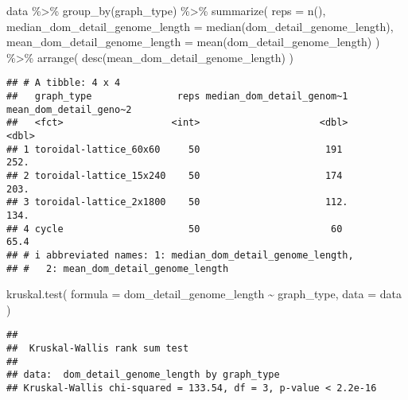 \documentclass[
]{book}
\newenvironment{Shaded}{\begin{snugshade}}{\end{snugshade}}
\newcommand{\AttributeTok}[1]{\textcolor[rgb]{0.77,0.63,0.00}{#1}}
\newcommand{\FunctionTok}[1]{\textcolor[rgb]{0.00,0.00,0.00}{#1}}
\newcommand{\NormalTok}[1]{#1}
\newcommand{\SpecialCharTok}[1]{\textcolor[rgb]{0.00,0.00,0.00}{#1}}
\begin{document}
\begin{Shaded}
\begin{Highlighting}[]
\NormalTok{data }\SpecialCharTok{\%\textgreater{}\%}
  \FunctionTok{group\_by}\NormalTok{(graph\_type) }\SpecialCharTok{\%\textgreater{}\%}
  \FunctionTok{summarize}\NormalTok{(}
    \AttributeTok{reps =} \FunctionTok{n}\NormalTok{(),}
    \AttributeTok{median\_dom\_detail\_genome\_length =} \FunctionTok{median}\NormalTok{(dom\_detail\_genome\_length),}
    \AttributeTok{mean\_dom\_detail\_genome\_length =} \FunctionTok{mean}\NormalTok{(dom\_detail\_genome\_length)}
\NormalTok{  ) }\SpecialCharTok{\%\textgreater{}\%}
  \FunctionTok{arrange}\NormalTok{(}
    \FunctionTok{desc}\NormalTok{(mean\_dom\_detail\_genome\_length)}
\NormalTok{  )}
\end{Highlighting}
\end{Shaded}

\begin{verbatim}
## # A tibble: 4 x 4
##   graph_type               reps median_dom_detail_genom~1 mean_dom_detail_geno~2
##   <fct>                   <int>                     <dbl>                  <dbl>
## 1 toroidal-lattice_60x60     50                      191                   252. 
## 2 toroidal-lattice_15x240    50                      174                   203. 
## 3 toroidal-lattice_2x1800    50                      112.                  134. 
## 4 cycle                      50                       60                    65.4
## # i abbreviated names: 1: median_dom_detail_genome_length,
## #   2: mean_dom_detail_genome_length
\end{verbatim}

\begin{Shaded}
\begin{Highlighting}[]
\FunctionTok{kruskal.test}\NormalTok{(}
  \AttributeTok{formula =}\NormalTok{ dom\_detail\_genome\_length }\SpecialCharTok{\textasciitilde{}}\NormalTok{ graph\_type,}
  \AttributeTok{data =}\NormalTok{ data}
\NormalTok{)}
\end{Highlighting}
\end{Shaded}

\begin{verbatim}
## 
##  Kruskal-Wallis rank sum test
## 
## data:  dom_detail_genome_length by graph_type
## Kruskal-Wallis chi-squared = 133.54, df = 3, p-value < 2.2e-16
\end{verbatim}
\end{document}
